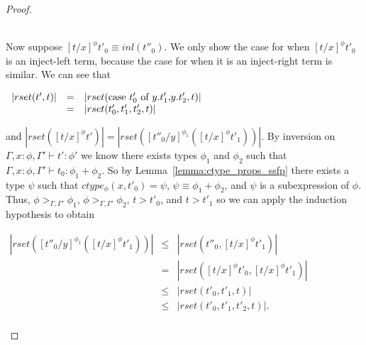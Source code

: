 \begin{proof}
\begin{itemize}
  \ \\
  Now suppose $[t/x]^\phi t'_0 \equiv inl(t''_0)$.  We only show the case for when $[t/x]^\phi t'_0$ is an inject-left
  term, because the case for when it is an inject-right term is similar.  We can see that 
  \begin{center}
    \begin{math}
      \begin{array}{lll}
        |rset(t',t)| & = & |rset(\mbox{case}\ t'_0\ \text{of}\ y\text{.}t'_1\text{,}y\text{.}t'_2,t)|\\
        & = & |rset(t'_0,t'_1,t'_2,t)|
      \end{array}
    \end{math}
  \end{center}
  and $|rset([t/x]^\phi t')| = |rset([t''_0/y]^{\phi_1} ([t/x]^\phi t'_1))|$.    By inversion on $\Gamma,x:\phi,\Gamma' \vdash t':\phi'$ we know there exists
  types $\phi_1$ and $\phi_2$ such that $\Gamma,x:\phi,\Gamma' \vdash t_0:\phi_1+\phi_2$.
  So by Lemma~\ref{lemma:ctype_props_ssfp} there exists a type $\psi$ such that $ctype_\phi (x,t'_0) = \psi$, $\psi \equiv \phi_1+\phi_2$, and $\psi$ is a 
  subexpression of $\phi$.  Thus, $\phi >_{\Gamma,\Gamma'} \phi_1$, $\phi >_{\Gamma,\Gamma'} \phi_2$, $t > t'_0$, and $t > t'_1$ so we can apply the induction hypothesis
  to obtain 
  \begin{center}
    \begin{math}
      \begin{array}{lll}
        |rset([t''_0/y]^{\phi_1} ([t/x]^\phi t'_1))| & \leq & |rset(t''_0,[t/x]^\phi t'_1)|\\
        & =    & |rset([t/x]^\phi t'_0,[t/x]^\phi t'_1)|\\
        & \leq & |rset(t'_0, t'_1, t)|\\
        & \leq & |rset(t'_0, t'_1, t'_2, t)|.\\
      \end{array}
    \end{math}
  \end{center}
    

\end{itemize}
\end{proof}
